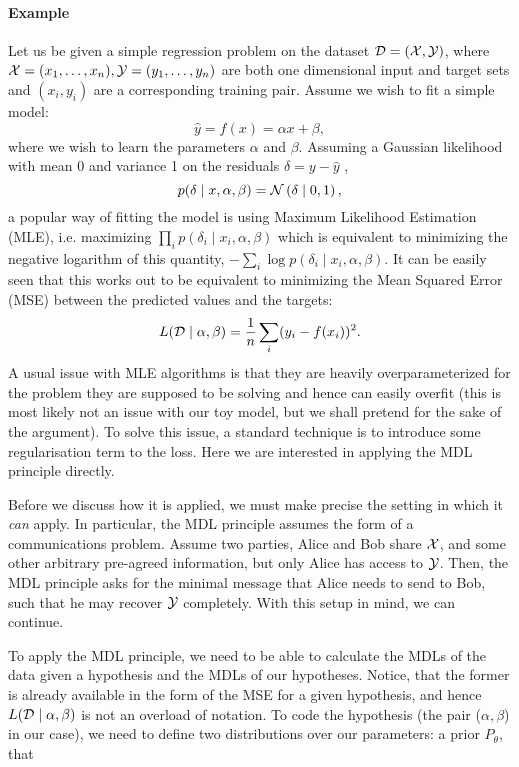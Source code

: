 \paragraph{Example}
Let us be given a simple regression problem on the dataset $\mathcal{D} = (\mathcal{X}, \mathcal{Y})$,
where $\mathcal{X} = (x_1, \hdots, x_n), \mathcal{Y} = (y_1, \hdots, y_n)$ are both one
dimensional input and target sets and $(x_i, y_i)$ are a corresponding training
pair. Assume we wish to fit a simple model:
\[
  \hat{y} = f(x) = \alpha x + \beta,
\]
where we wish to learn the parameters $\alpha$ and $\beta$.
Assuming a Gaussian likelihood with mean 0 and variance 1 on the residuals $\delta
= y - \hat{y}$ ,
\[
  p(\delta \mid x, \alpha, \beta) = \mathcal{N}\left( \delta \mid 0, 1 \right),
\]
a popular way of fitting the model is using Maximum Likelihood Estimation (MLE),
i.e. maximizing $\prod_i p(\delta_i \mid x_i, \alpha, \beta)$ which is equivalent to
minimizing the negative logarithm of this quantity, $-\sum_i \log p(\delta_i \mid
x_i, \alpha, \beta)$. It can be easily seen that this works out to be equivalent
to minimizing the Mean Squared Error (MSE) between the predicted values and the
targets:
\[
  L(\mathcal{D} \mid \alpha, \beta) = \frac{1}{n} \sum_i (y_i - f(x_i))^2.
\]
A usual issue with MLE algorithms is that they are heavily overparameterized for
the problem they are supposed to be solving and hence can easily overfit (this
is most likely not an issue with our toy model, but we shall pretend for the
sake of the argument). To solve this issue, a standard technique is to
introduce some regularisation term to the loss. Here we are interested in
applying the MDL principle directly.
\par
Before we discuss how it is applied, we must make precise the setting in which
it \textit{can} apply. In particular, the MDL principle assumes the form of a
communications problem. Assume two parties, Alice and Bob share $\mathcal{X}$, and some
other arbitrary pre-agreed information, but only Alice has access to $\mathcal{Y}$. Then,
the MDL principle asks for the minimal message that Alice needs to send to Bob,
such that he may recover $\mathcal{Y}$ completely. With this setup in mind, we can continue.
\par
To apply the MDL principle, we need to be able to calculate the
MDLs of the data given a hypothesis and the MDLs of our hypotheses.
Notice, that the former is already available
in the form of the MSE for a given hypothesis, and hence $L(\mathcal{D} \mid \alpha,
\beta)$ is not an overload of notation. To code the hypothesis
(the pair ($\alpha, \beta$) in our
case), we need to define two distributions over our parameters: a prior $P_\theta$, that
